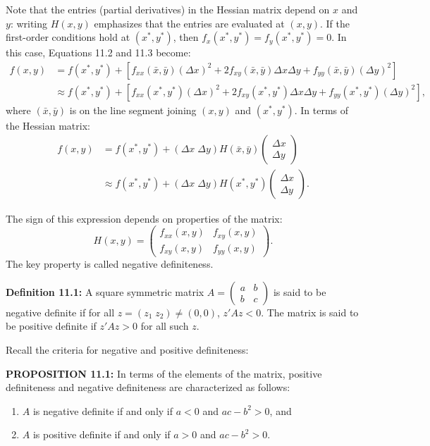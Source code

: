 \begin{original}
Note that the entries (partial derivatives) in the Hessian matrix depend on $x$ and $y$: writing $H(x, y)$ emphasizes that the entries are evaluated at $(x, y)$. If the first-order conditions hold at $(x^*, y^*)$, then $f_x(x^*, y^*) = f_y(x^*, y^*) = 0$. In this case, Equations 11.2 and 11.3 become:
\begin{align}
f(x, y) &= f(x^*, y^*) + [f_{xx}(\bar{x}, \bar{y})(\Delta x)^2 + 2f_{xy}(\bar{x}, \bar{y})\Delta x\Delta y + f_{yy}(\bar{x}, \bar{y})(\Delta y)^2] \tag{11.6}\\
&\approx f(x^*, y^*) + [f_{xx}(x^*, y^*)(\Delta x)^2 + 2f_{xy}(x^*, y^*)\Delta x\Delta y + f_{yy}(x^*, y^*)(\Delta y)^2], \tag{11.7}
\end{align}
where $(\bar{x}, \bar{y})$ is on the line segment joining $(x, y)$ and $(x^*, y^*)$. In terms of the Hessian matrix:
\begin{align}
f(x, y) &= f(x^*, y^*) + (\Delta x\; \Delta y) H(\bar{x}, \bar{y}) \begin{pmatrix} \Delta x \\ \Delta y \end{pmatrix} \tag{11.8}\\
&\approx f(x^*, y^*) + (\Delta x\; \Delta y) H(x^*, y^*) \begin{pmatrix} \Delta x \\ \Delta y \end{pmatrix}. \tag{11.9}
\end{align}

The sign of this expression depends on properties of the matrix:
\[
H(x, y) = \begin{pmatrix} f_{xx}(x, y) & f_{xy}(x, y) \\ f_{xy}(x, y) & f_{yy}(x, y) \end{pmatrix}.
\]
The key property is called negative definiteness.

\textbf{Definition 11.1:} A square symmetric matrix $A = \begin{pmatrix} a & b \\ b & c \end{pmatrix}$ is said to be negative definite if for all $z = (z_1\; z_2) \neq (0,0)$, $z'Az < 0$. The matrix is said to be positive definite if $z'Az > 0$ for all such $z$.

Recall the criteria for negative and positive definiteness:

\textbf{PROPOSITION 11.1:} In terms of the elements of the matrix, positive definiteness and negative definiteness are characterized as follows:
\begin{enumerate}
\item $A$ is negative definite if and only if $a < 0$ and $ac - b^2 > 0$, and
\item $A$ is positive definite if and only if $a > 0$ and $ac - b^2 > 0$.
\end{enumerate}


\end{original}
